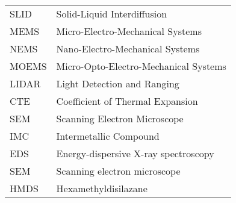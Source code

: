 \documentclass[english,12pt,a4paper,pdftex,elec,utf8]{aaltothesis}
\begin{document}
\newpage

\iffalse
\thesistableofcontents




		\begin{tabular}{ll}
                            
            SLID & Solid-Liquid Interdiffusion \\
            MEMS &  Micro-Electro-Mechanical Systems \\ 
            NEMS &  Nano-Electro-Mechanical Systems \\
            MOEMS & Micro-Opto-Electro-Mechanical Systems \\ 
            LIDAR & Light Detection and Ranging \\                          
            CTE & Coefficient of Thermal Expansion \\
            SEM & Scanning Electron Microscope \\ 
            IMC & Intermetallic Compound \\
            EDS & Energy-dispersive X-ray spectroscopy \\
            SEM & Scanning electron microscope \\
            HMDS & Hexamethyldisilazane \\

		\end{tabular}



\end{document}
